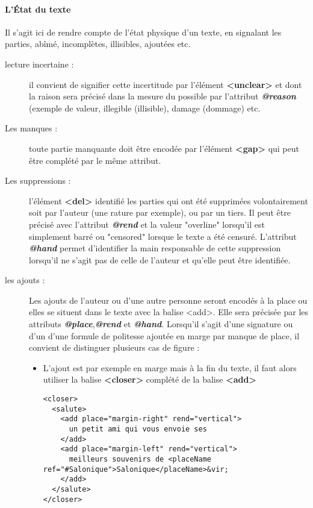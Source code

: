\documentclass[18pt,a4paper,oneside]{book} %
\begin{document}
\paragraph{L'État du texte}

Il s'agit ici de rendre compte de l'état physique d'un texte, en signalant les parties, abîmé, incomplètes, illisibles, ajoutées etc.

\begin{description}
\item [lecture incertaine : ] il convient de signifier cette incertitude par l'élément \textbf{<unclear>} et dont la raison sera précisé dans la mesure du possible par l'attribut \textbf{\textit{@reason}} (exemple de valeur, illegible (illisible), damage (dommage) etc.
\item [Les manques : ] toute partie manquante doit être encodée par l'élément \textbf{<gap>} qui peut être complété par le même attribut.
\item [Les suppressions :] l'élément \textbf{<del>} identifié les parties qui ont été supprimées volontairement soit par l'auteur (une rature par exemple), ou par un tiers. Il peut être précisé avec l'attribut \textbf{\textit{@rend}} et la valeur "overline" lorsqu'il est simplement barré ou "censored" lorsque le texte a été censuré. L'attribut \textit{\textbf{@hand}} permet d'identifier la main responsable de cette suppression lorsqu'il ne s'agit pas de celle de l'auteur et qu'elle peut être identifiée.
\item [les ajouts : ] Les ajouts de l'auteur ou d'une autre personne seront encodés à la place ou elles se situent dans le texte avec la balise <add>. Elle sera précisée par les attributs \textit{\textbf{@place}},\textbf{\textit{@rend}} et \textbf{\textit{@hand}}. Lorsqu'il s'agit d'une signature ou d'un d'une formule de politesse ajoutée en marge par manque de place, il convient de distinguer plusieurs cas de figure :
\begin{itemize}
\item L'ajout est par exemple en marge mais à la fin du texte, il faut alors utiliser la balise \textbf{<closer>} complété de la balise \textbf{<add>}
\begin{lstlisting}
<closer>
  <salute>
    <add place="margin-right" rend="vertical">
      un petit ami qui vous envoie ses
    </add> 
    <add place="margin-left" rend="vertical">
      meilleurs souvenirs de <placeName ref="#Salonique">Salonique</placeName>&vir;
    </add>
  </salute>
</closer>
\end{lstlisting}

\end{itemize}
\end{description}
\end{document}

